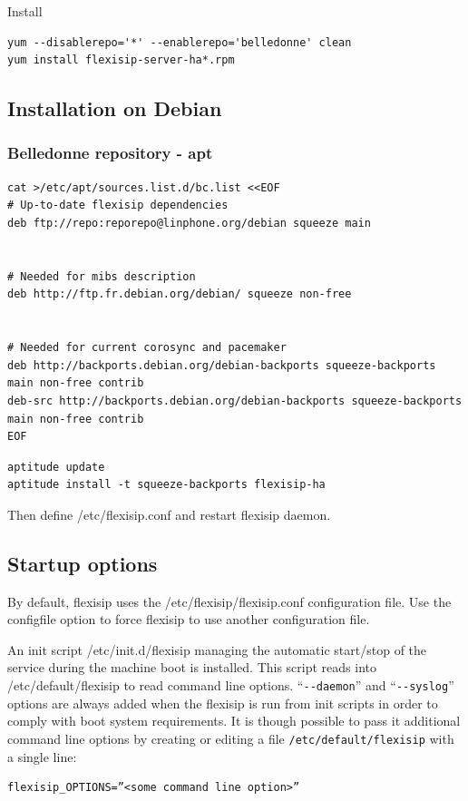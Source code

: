 \documentclass[a4paper,10pt]{article}
\begin{document}
Install
\begin{verbatim}
yum --disablerepo='*' --enablerepo='belledonne' clean
yum install flexisip-server-ha*.rpm
\end{verbatim}


\subsection{Installation on Debian}
\subsubsection{Belledonne repository - apt}
\begin{verbatim}
cat >/etc/apt/sources.list.d/bc.list <<EOF
# Up-to-date flexisip dependencies
deb ftp://repo:reporepo@linphone.org/debian squeeze main


# Needed for mibs description
deb http://ftp.fr.debian.org/debian/ squeeze non-free


# Needed for current corosync and pacemaker
deb http://backports.debian.org/debian-backports squeeze-backports main non-free contrib
deb-src http://backports.debian.org/debian-backports squeeze-backports main non-free contrib
EOF
\end{verbatim} 

\begin{verbatim}
aptitude update
aptitude install -t squeeze-backports flexisip-ha
\end{verbatim}


Then define /etc/flexisip.conf and restart flexisip daemon.


\subsection{Startup options}
By default, flexisip uses the /etc/flexisip/flexisip.conf configuration file.
Use the configfile option to force flexisip to use another configuration file.

An init script /etc/init.d/flexisip managing the automatic start/stop of the service during the machine boot is installed.
This script reads into /etc/default/flexisip to read command line options. “\verb|--daemon|” and “\verb|--syslog|” options are always added when the flexisip is run from init scripts in order to comply with boot system requirements.
It is though possible to pass it additional command line options by creating or editing a file \verb|/etc/default/flexisip| with a single line:
\begin{verbatim}
flexisip_OPTIONS=”<some command line option>” 
\end{verbatim}
\end{document}
